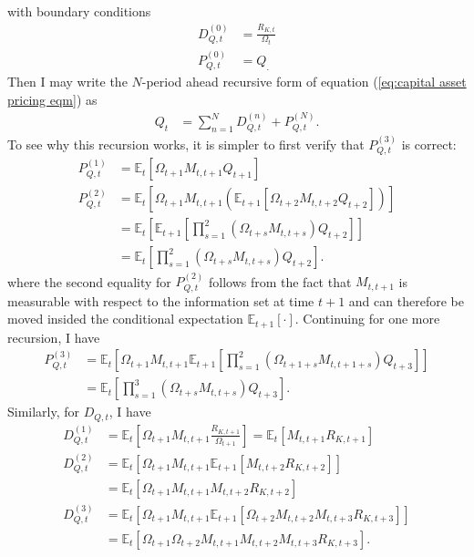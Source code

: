 \documentclass[12 pt, oneside]{article}
\theoremstyle{definition}
\theoremstyle{definition}
\theoremstyle{definition}
\newcommand{\E}{\mathbb{E}}
\begin{document}
with boundary conditions
\begin{align*}
  D_{Q, t}^{(0)} & = \frac{R_{K, t}}{\Omega_t}\\
  P_{Q, t}^{(0)} & = Q_.
\end{align*}
Then I may write the $N$-period ahead recursive form of equation (\ref{eq:capital asset pricing eqm}) as
\begin{align*}
  Q_t & = \sum_{n = 1}^ND_{Q, t}^{(n)} + P_{Q, t}^{(N)}.
\end{align*}
To see why this recursion works, it is simpler to first verify that $P_{Q, t}^{(3)}$ is correct:
\begin{align*}
  P_{Q, t}^{(1)} & = \E_t\left[\Omega_{t + 1}M_{t, t + 1} Q_{t + 1}\right]\\
  P_{Q, t}^{(2)} & = \E_t\left[\Omega_{t + 1}M_{t, t + 1} (\E_{t + 1}[\Omega_{t + 2}M_{t, t + 2} Q_{t + 2}])\right]\\
                 & = \E_t\left[\E_{t + 1}\left[\prod_{s = 1}^2(\Omega_{t + s}M_{t, t + s}) Q_{t + 2}\right]\right]\\
                 & = \E_t\left[\prod_{s = 1}^2(\Omega_{t + s}M_{t, t + s}) Q_{t + 2}\right].
\end{align*}
where the second equality for $P_{Q, t}^{(2)}$ follows from the fact that $M_{t, t + 1}$ is measurable with respect to the information set at time $t + 1$ and can
therefore be moved insided the conditional expectation $\E_{t + 1}[\cdot]$. Continuing for one more recursion, I have
\begin{align*}
  P_{Q, t}^{(3)} & = \E_t\left[\Omega_{t + 1}M_{t, t + 1}\E_{t + 1}\left[\prod_{s = 1}^2(\Omega_{t + 1 + s}M_{t, t + 1 + s}) Q_{t + 3}\right]\right]\\
                 & = \E_t\left[\prod_{s = 1}^3(\Omega_{t + s}M_{t, t + s}) Q_{t + 3}\right].
\end{align*}
Similarly, for $D_{Q, t}$, I have
\begin{align*}
  D_{Q, t}^{(1)} & = \E_t\left[\Omega_{t + 1}M_{t, t + 1}\frac{R_{K, t + 1}}{\Omega_{t + 1}}\right] = \E_t[M_{t, t + 1} R_{K, t + 1}]\\
  D_{Q, t}^{(2)} & = \E_t[\Omega_{t + 1}M_{t, t + 1}\E_{t + 1}[M_{t, t + 2}R_{K, t + 2}]]\\
                 & = \E_t[\Omega_{t + 1}M_{t, t + 1}M_{t, t + 2}R_{K, t + 2}]\\
  D_{Q, t}^{(3)} & = \E_t[\Omega_{t + 1}M_{t, t + 1}\E_{t + 1}[\Omega_{t + 2}M_{t, t + 2}M_{t, t + 3}R_{K, t + 3}]]\\
                 & = \E_t[\Omega_{t + 1}\Omega_{t + 2}M_{t, t + 1}M_{t, t + 2}M_{t, t + 3}R_{K, t + 3}].
\end{align*}
\end{document}

